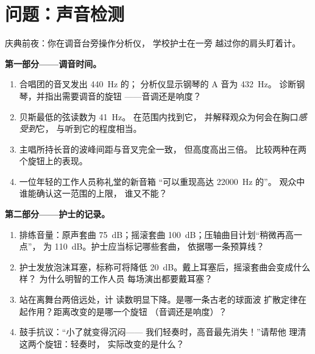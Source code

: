 \section{问题：声音检测}

\begin{problem}\label{pb:g8:sound-pitch-loudness:1}
庆典前夜：你在调音台旁操作分析仪，
学校护士在一旁
越过你的肩头盯着计。

\medskip\noindent\textbf{第一部分——调音时间。}
\begin{enumerate}
  \item 合唱团的音叉发出 \qty{440}{Hz} 的；
        分析仪显示钢琴的 A 音为 \qty{432}{Hz}。
        诊断钢琴，并指出需要调音的旋钮
        ——音调还是响度？
  \item 贝斯最低的弦读数为 \qty{41}{Hz}。
        在范围内找到它，
        并解释观众为何会在胸口\emph{感受到}它，
        与听到它的程度相当。
  \item 主唱所持长音的波峰间距与音叉完全一致，
        但高度高出三倍。
        比较两种在两个旋钮上的表现。
  \item 一位年轻的工作人员称礼堂的新音箱
        “可以重现高达 \qty{22000}{Hz} 的”。
        观众中谁能确认这一范围的上限，
        谁又不能？
\end{enumerate}

\medskip\noindent\textbf{第二部分——护士的记录。}
\begin{enumerate}[resume]
  \item 排练音量：原声套曲 \qty{75}{dB}；摇滚套曲
        \qty{100}{dB}；压轴曲目计划“稍微再高一点”，
        为 \qty{110}{dB}。护士应当标记哪些套曲，
        依据哪一条预算线？
  \item 护士发放泡沫耳塞，标称可将降低
        \qty{20}{dB}。戴上耳塞后，摇滚套曲会变成什么样？
        为什么明智的工作人员
        每场演出都要戴耳塞？
  \item 站在离舞台两倍远处，计
        读数明显下降。是哪一条古老的球面波
        扩散定律在起作用？距离改变的是哪一个旋钮
        （音调还是响度）？
  \item 鼓手抗议：“小了就变得沉闷——
        我们轻奏时，高音最先消失！”请帮他
        理清这两个旋钮：轻奏时，
        实际改变的是什么？
\end{enumerate}


\end{problem}
